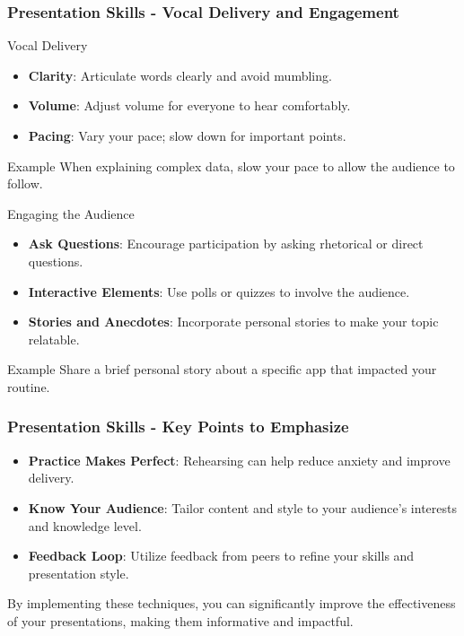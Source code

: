 \documentclass{beamer}
\begin{document}
\begin{frame}[fragile]
    \frametitle{Presentation Skills - Vocal Delivery and Engagement}
    \begin{block}{Vocal Delivery}
        \begin{itemize}
            \item \textbf{Clarity}: Articulate words clearly and avoid mumbling.
            \item \textbf{Volume}: Adjust volume for everyone to hear comfortably.
            \item \textbf{Pacing}: Vary your pace; slow down for important points.
        \end{itemize}
        
        \begin{block}{Example}
            When explaining complex data, slow your pace to allow the audience to follow.
        \end{block}
    \end{block}

    \begin{block}{Engaging the Audience}
        \begin{itemize}
            \item \textbf{Ask Questions}: Encourage participation by asking rhetorical or direct questions.
            \item \textbf{Interactive Elements}: Use polls or quizzes to involve the audience.
            \item \textbf{Stories and Anecdotes}: Incorporate personal stories to make your topic relatable.
        \end{itemize}
        
        \begin{block}{Example}
            Share a brief personal story about a specific app that impacted your routine.
        \end{block}
    \end{block}
\end{frame}

\begin{frame}[fragile]
    \frametitle{Presentation Skills - Key Points to Emphasize}
    \begin{itemize}
        \item \textbf{Practice Makes Perfect}: Rehearsing can help reduce anxiety and improve delivery.
        \item \textbf{Know Your Audience}: Tailor content and style to your audience's interests and knowledge level.
        \item \textbf{Feedback Loop}: Utilize feedback from peers to refine your skills and presentation style.
    \end{itemize}
    
    By implementing these techniques, you can significantly improve the effectiveness of your presentations, making them informative and impactful.
\end{frame}
\end{document}
